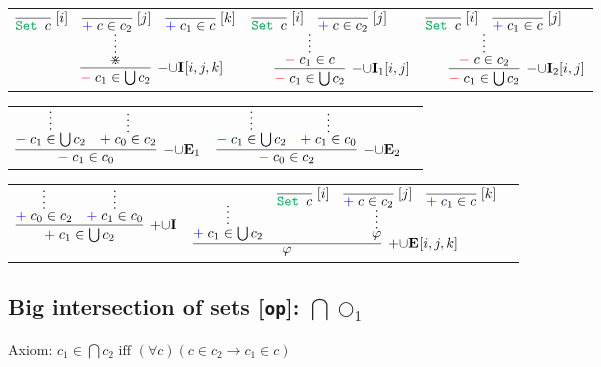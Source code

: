 \documentclass[11pt]{article}
\begin{document}
\noindent
\begin{tabular}{ccc}
$
\infer[\DenyRule{\cup}\Intro{}{[i,j,k]}]{\Deny{c_1\in \bigcup c_2}}{
    \infer*{\divideontimes}{
    	\infer[\Label{i}]{\Set{c}}{}
    	&
    	\infer[\Label{j}]{\Assert{c\in c_2}}{}
    	&
    	\infer[\Label{k}]{\Assert{c_1\in c}}{}
    }
}
$
\hspace{0.5cm}
&
$
\infer[\DenyRule{\cup}\Intro{1}{[i,j]}]{\Deny{c_1\in \bigcup c_2}}{
    \infer*{\Deny{c_1\in c}}{
    	\infer[\Label{i}]{\Set{c}}{}
    	&
    	\infer[\Label{j}]{\Assert{c\in c_2}}{}
    }
}
$
\hspace{0.5cm}
&
$
\infer[\DenyRule{\cup}\Intro{2}{[i,j]}]{\Deny{c_1\in \bigcup c_2}}{
    \infer*{\Deny{c\in c_2}}{
    	\infer[\Label{i}]{\Set{c}}{}
    	&
    	\infer[\Label{j}]{\Assert{c_1\in c}}{}
    }
}
$
\end{tabular}

\bigskip
\noindent

\begin{tabular}{ccc}
$
\infer[\DenyRule{\cup}\Elim{1}]{\Deny{c_1\in c_0}}{
	\infer*{\Deny{c_1\in \bigcup c_2}}{} 
	& 
	\infer*{\Assert{c_0\in c_2}}{}
}
$
\hspace{1cm}
&
$
\infer[\DenyRule{\cup}\Elim{2}]{\Deny{c_0\in c_2}}{
	\infer*{\Deny{c_1\in \bigcup c_2}}{} 
	& 
	\infer*{\Assert{c_1\in c_0}}{}
}
$
\end{tabular}

\bigskip
\noindent
\begin{tabular}{ccc}
$
\infer[\AssertRule{\cup}\Intro{}]{\Assert{c_1\in \bigcup c_2}}{
	\infer*{\Assert{c_0\in c_2}}{}
	& 
	\infer*{\Assert{c_1\in c_0}}{}
}
$
\hspace{1cm}
&
$
\infer[\AssertRule{\cup}\Elim{}{[i,j,k]}]{\varphi}{
	\infer*{\Assert{c_1\in \bigcup c_2}}{}
	&
	\infer*{\varphi}{
		\infer[\Label{i}]{\Set{c}}{}
		&
		\infer[\Label{j}]{\Assert{c\in c_2}}{}
		&
		\infer[\Label{k}]{\Assert{c_1\in c}}{}
	}
}
$
\end{tabular}
\bigskip


\subsection*{Big intersection of sets [\texttt{op}]: $\bigcap\bigcirc_1$}

\smallskip
\noindent
Axiom: $c_1 \in \bigcap c_2\text{ iff }
(\forall c) (c\in c_2 \to c_1\in c)$
\smallskip
\smallskip
\smallskip
\end{document}
